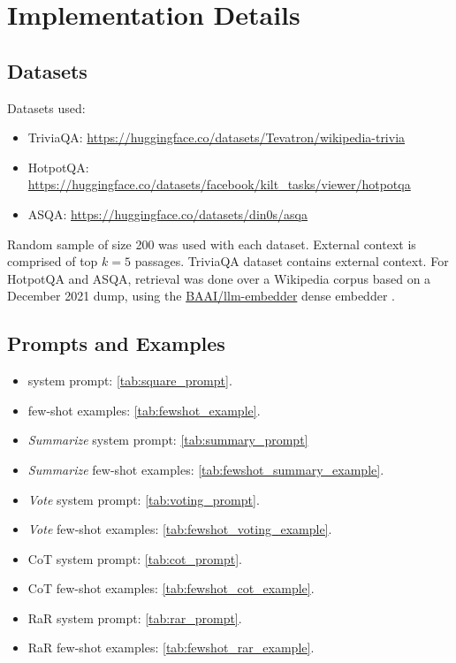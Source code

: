 \section{Implementation Details}

\subsection{Datasets}
\label{sec:datasets}

Datasets used:
\begin{itemize}[noitemsep,topsep=0.5em,parsep=0.4em,leftmargin=1.5em]
\item TriviaQA: {\small \url{https://huggingface.co/datasets/Tevatron/wikipedia-trivia}}
\item HotpotQA: {\small \url{https://huggingface.co/datasets/facebook/kilt_tasks/viewer/hotpotqa}}
\item ASQA: {\small \url{https://huggingface.co/datasets/din0s/asqa}}
\end{itemize}

\noindent
Random sample of size 200 was used with each dataset. External context is comprised of top \mbox{$k=5$} passages. TriviaQA dataset contains external context. For HotpotQA and ASQA, retrieval was done over a Wikipedia corpus based on a December 2021 dump, using the \href{https://huggingface.co/BAAI/llm-embedder}{BAAI/llm-embedder} dense embedder \cite{zhangRetrieveAnythingAugment2023}.

\subsection{Prompts and Examples}
\label{sec:prompts}

\begin{itemize}

\item \rephrase{} system prompt: \ref{tab:square_prompt}.
\item \rephrase{} few-shot examples: \ref{tab:fewshot_example}.

\item \textit{Summarize} system prompt: \ref{tab:summary_prompt}
\item \textit{Summarize} few-shot examples: \ref{tab:fewshot_summary_example}.    

\item \textit{Vote} system prompt: \ref{tab:voting_prompt}.
\item \textit{Vote} few-shot examples: \ref{tab:fewshot_voting_example}.

\item CoT system prompt: \ref{tab:cot_prompt}.
\item CoT few-shot examples: \ref{tab:fewshot_cot_example}.

\item RaR system prompt: \ref{tab:rar_prompt}.
\item RaR few-shot examples: \ref{tab:fewshot_rar_example}.

\end{itemize}

